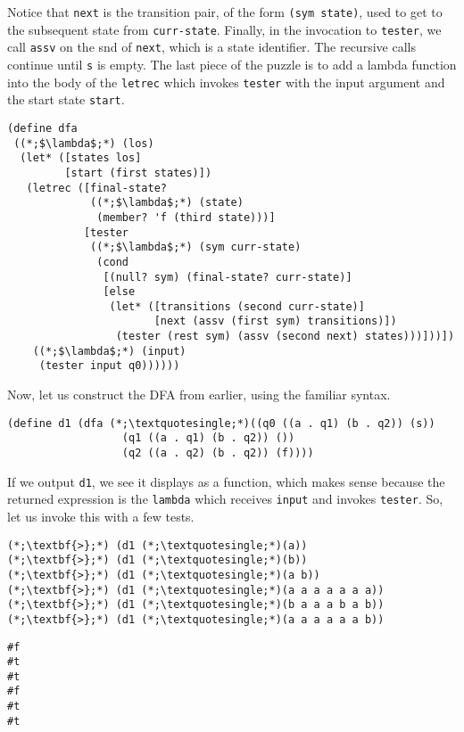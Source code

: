 Notice that \texttt{next} is the transition pair, of the form \texttt{\textquotesingle(sym state)}, used to get to the subsequent state from \texttt{curr-state}. Finally, in the invocation to \texttt{tester}, we call \texttt{assv} on the snd of \texttt{next}, which is a state identifier. The recursive calls continue until \texttt{s} is empty. The last piece of the puzzle is to add a lambda function into the body of the \texttt{letrec} which invokes \texttt{tester} with the input argument and the start state \texttt{start}.

\begin{cl}[]{}\begin{lstlisting}[language=MyScheme]
(define dfa
 ((*;$\lambda$;*) (los)
  (let* ([states los]
         [start (first states)])
   (letrec ([final-state?
             ((*;$\lambda$;*) (state)
              (member? 'f (third state)))]
            [tester 
             ((*;$\lambda$;*) (sym curr-state)
              (cond
               [(null? sym) (final-state? curr-state)]
               [else
                (let* ([transitions (second curr-state)]
                       [next (assv (first sym) transitions)])
                 (tester (rest sym) (assv (second next) states)))]))])
    ((*;$\lambda$;*) (input)
     (tester input q0))))))
\end{lstlisting}\end{cl}

\noindent Now, let us construct the DFA from earlier, using the familiar syntax.

\begin{cl}[]{}\begin{lstlisting}[language=MyScheme]
(define d1 (dfa (*;\textquotesingle;*)((q0 ((a . q1) (b . q2)) (s))
                  (q1 ((a . q1) (b . q2)) ())
                  (q2 ((a . q2) (b . q2)) (f))))
\end{lstlisting}\end{cl}

If we output \texttt{d1}, we see it displays as a function, which makes sense because the returned expression is the \texttt{lambda} which receives \texttt{input} and invokes \texttt{tester}. So, let us invoke this with a few tests.

\begin{cloast}[]{}
\begin{lstlisting}[language=MyNLNScheme]
(*;\textbf{>};*) (d1 (*;\textquotesingle;*)(a))
(*;\textbf{>};*) (d1 (*;\textquotesingle;*)(b))
(*;\textbf{>};*) (d1 (*;\textquotesingle;*)(a b))
(*;\textbf{>};*) (d1 (*;\textquotesingle;*)(a a a a a a a))
(*;\textbf{>};*) (d1 (*;\textquotesingle;*)(b a a a b a b))
(*;\textbf{>};*) (d1 (*;\textquotesingle;*)(a a a a a a b))
\end{lstlisting}
\tcblower
\begin{lstlisting}[language=MyOutput]
#f
#t
#t
#f
#t
#t
\end{lstlisting}
\end{cloast}

